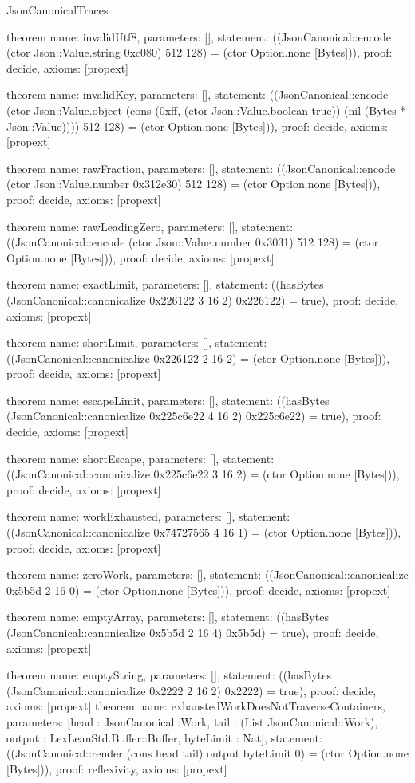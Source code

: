 \begin{lexlean}{JsonCanonicalTraces}
\begin{semanticmodule}
theorem{
 name: invalidUtf8,
 parameters: [],
 statement: ((JsonCanonical::encode (ctor Json::Value.string 0xc080) 512 128) = (ctor Option.none [Bytes])),
 proof: decide{},
 axioms: [propext]
}

theorem{
 name: invalidKey,
 parameters: [],
 statement: ((JsonCanonical::encode (ctor Json::Value.object (cons (0xff, (ctor Json::Value.boolean true)) (nil (Bytes * Json::Value)))) 512 128) = (ctor Option.none [Bytes])),
 proof: decide{},
 axioms: [propext]
}

theorem{
 name: rawFraction,
 parameters: [],
 statement: ((JsonCanonical::encode (ctor Json::Value.number 0x312e30) 512 128) = (ctor Option.none [Bytes])),
 proof: decide{},
 axioms: [propext]
}

theorem{
 name: rawLeadingZero,
 parameters: [],
 statement: ((JsonCanonical::encode (ctor Json::Value.number 0x3031) 512 128) = (ctor Option.none [Bytes])),
 proof: decide{},
 axioms: [propext]
}

theorem{
 name: exactLimit,
 parameters: [],
 statement: ((hasBytes (JsonCanonical::canonicalize 0x226122 3 16 2) 0x226122) = true),
 proof: decide{},
 axioms: [propext]
}

theorem{
 name: shortLimit,
 parameters: [],
 statement: ((JsonCanonical::canonicalize 0x226122 2 16 2) = (ctor Option.none [Bytes])),
 proof: decide{},
 axioms: [propext]
}

theorem{
 name: escapeLimit,
 parameters: [],
 statement: ((hasBytes (JsonCanonical::canonicalize 0x225c6e22 4 16 2) 0x225c6e22) = true),
 proof: decide{},
 axioms: [propext]
}

theorem{
 name: shortEscape,
 parameters: [],
 statement: ((JsonCanonical::canonicalize 0x225c6e22 3 16 2) = (ctor Option.none [Bytes])),
 proof: decide{},
 axioms: [propext]
}

theorem{
 name: workExhausted,
 parameters: [],
 statement: ((JsonCanonical::canonicalize 0x74727565 4 16 1) = (ctor Option.none [Bytes])),
 proof: decide{},
 axioms: [propext]
}

theorem{
 name: zeroWork,
 parameters: [],
 statement: ((JsonCanonical::canonicalize 0x5b5d 2 16 0) = (ctor Option.none [Bytes])),
 proof: decide{},
 axioms: [propext]
}

theorem{
 name: emptyArray,
 parameters: [],
 statement: ((hasBytes (JsonCanonical::canonicalize 0x5b5d 2 16 4) 0x5b5d) = true),
 proof: decide{},
 axioms: [propext]
}

theorem{
 name: emptyString,
 parameters: [],
 statement: ((hasBytes (JsonCanonical::canonicalize 0x2222 2 16 2) 0x2222) = true),
 proof: decide{},
 axioms: [propext]
}
theorem{
 name: exhaustedWorkDoesNotTraverseContainers,
 parameters: [head : JsonCanonical::Work, tail : (List JsonCanonical::Work), output : LexLeanStd.Buffer::Buffer, byteLimit : Nat],
 statement: ((JsonCanonical::render (cons head tail) output byteLimit 0) = (ctor Option.none [Bytes])),
 proof: reflexivity{},
 axioms: [propext]
}


\end{semanticmodule}
\end{lexlean}
